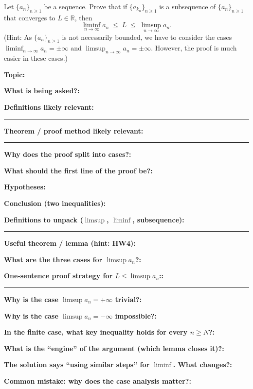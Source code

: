 \documentclass[12pt]{article}
\newcommand{\fillfield}[1]{%
  \par\noindent\textbf{#1:}\enspace\hrulefill\par\vspace{3pt}%
}
\newcommand{\fillfieldlong}[1]{%
  \par\noindent\textbf{#1:}\par\vspace{1.5cm}%
  \noindent\rule{\linewidth}{0.35pt}\par\vspace{4pt}%
}
\begin{document}
\begin{tcolorbox}[
  enhanced, breakable,
  colback  = probblue,
  colframe = blue!55!black,
  fonttitle = \bfseries,
  title = {\textsc{Problem Statement}\hfill Homework 5, Problem 2}
]
Let $\{a_n\}_{n \geq 1}$ be a sequence.
Prove that if $\{a_{k_n}\}_{n \geq 1}$ is a subsequence of $\{a_n\}_{n \geq 1}$
that converges to $L \in \mathbb{R}$, then
\[
  \liminf_{n \to \infty} a_n \;\leq\; L \;\leq\; \limsup_{n \to \infty} a_n.
\]
(Hint: As $\{a_n\}_{n \geq 1}$ is not necessarily bounded, we have to consider
the cases $\liminf_{n \to \infty} a_n = \pm\infty$ and
$\limsup_{n \to \infty} a_n = \pm\infty$.
However, the proof is much easier in these cases.)
\end{tcolorbox}

\bigskip

\begin{tcolorbox}[
  enhanced, breakable,
  colback  = pass1green,
  colframe = green!55!black,
  fonttitle = \bfseries,
  title = {Pass 1 \enspace\textbf{--}\enspace First Diagnosis}
]
\fillfield{Topic}
\fillfield{What is being asked?}
\fillfieldlong{Definitions likely relevant}
\fillfieldlong{Theorem / proof method likely relevant}
\fillfield{Why does the proof split into cases?}
\fillfield{What should the first line of the proof be?}
\end{tcolorbox}

\bigskip

\begin{tcolorbox}[
  enhanced, breakable,
  colback  = pass2yellow,
  colframe = yellow!65!black,
  fonttitle = \bfseries,
  title = {Pass 2 \enspace\textbf{--}\enspace Proof Recipe Card}
]
\fillfield{Hypotheses}
\fillfield{Conclusion (two inequalities)}
\fillfieldlong{Definitions to unpack ($\limsup$, $\liminf$, subsequence)}
\fillfield{Useful theorem / lemma (hint: HW4)}
\fillfield{What are the three cases for $\limsup a_n$?}
\fillfieldlong{One-sentence proof strategy for $L \leq \limsup a_n$:}
\end{tcolorbox}

\bigskip

\begin{tcolorbox}[
  enhanced, breakable,
  colback  = pass3orange,
  colframe = orange!65!black,
  fonttitle = \bfseries,
  title = {Pass 3 \enspace\textbf{--}\enspace Self-Explanation}
]
\fillfield{Why is the case $\limsup a_n = +\infty$ trivial?}
\fillfield{Why is the case $\limsup a_n = -\infty$ impossible?}
\fillfield{In the finite case, what key inequality holds for every $n \geq N$?}
\fillfield{What is the ``engine'' of the argument (which lemma closes it)?}
\fillfield{The solution says ``using similar steps'' for $\liminf$. What changes?}
\fillfield{Common mistake: why does the case analysis matter?}
\end{tcolorbox}
\end{document}
